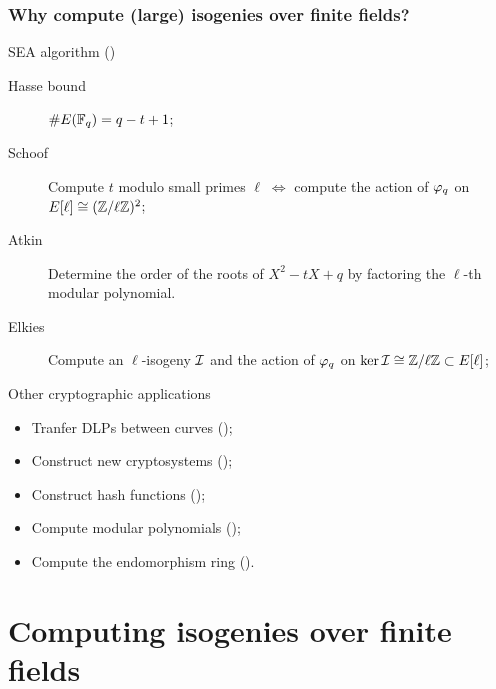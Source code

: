 \documentclass[10pt,usepdftitle=false]{beamer}
\begin{document}

\begin{frame}
  \frametitle{Why compute (large) isogenies over finite fields?}
  
  \begin{block}{SEA algorithm (\cite{schoof85,elkies92,atkin88})}
    \begin{description}
    \item[Hasse bound] \hfill{\large\emph{$\# E(\mathbb{F}_q)= q-t+1$}};\hfill\strut
    \item[Schoof] Compute $t$ modulo small primes
      $\ell\;\Leftrightarrow$ compute the action of $\varphi_q$ on
      \emph{$E[\ell]\cong(\mathbb{Z}/\ell\mathbb{Z})^2$};
    \item[Atkin] Determine the order of the roots of $X^2 -tX +q$ by
      factoring the $\ell$-th modular polynomial.
    \item[Elkies] Compute an $\ell$-isogeny $\mathcal{I}$ and the action of
      $\varphi_q$ on \emph{$\ker\mathcal{I}\cong\mathbb{Z}/\ell\mathbb{Z}\subset E[\ell]$};
    \end{description}
  \end{block}

  \begin{block}{Other cryptographic applications}
    \begin{itemize}
    \item Tranfer DLPs between curves (\cite{gaudry+hess+smart02,smith09});
    \item Construct new cryptosystems (\cite{teske06,rostovtsev+stolbunov06});
    \item Construct hash functions (\cite{charles+lauter+goren09});
    \item Compute modular polynomials (\cite{sutherland10:modpol});
    \item Compute the endomorphism ring (\cite{kohel,sutherland10:hilbert}).
    \end{itemize}
  \end{block}
\end{frame}


\section{Computing isogenies over finite fields}
\end{document}
